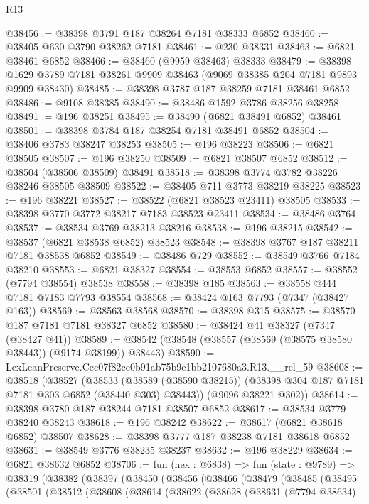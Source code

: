 \begin{lexlean}{R13}
\begin{coremodule}
@38456 := @38398 @3791 @187 @38264 @7181 @38333 @6852
@38460 := @38405 @630 @3790 @38262 @7181
@38461 := @230 @38331
@38463 := @6821 @38461 @6852
@38466 := @38460 (@9959 @38463) @38333
@38479 := @38398 @1629 @3789 @7181 @38261 @9909 @38463 (@9069 @38385 @204 @7181 @9893 @9909 @38430)
@38485 := @38398 @3787 @187 @38259 @7181 @38461 @6852
@38486 := @9108 @38385
@38490 := @38486 @1592 @3786 @38256 @38258
@38491 := @196 @38251
@38495 := @38490 (@6821 @38491 @6852) @38461
@38501 := @38398 @3784 @187 @38254 @7181 @38491 @6852
@38504 := @38406 @3783 @38247 @38253
@38505 := @196 @38223
@38506 := @6821 @38505
@38507 := @196 @38250
@38509 := @6821 @38507 @6852
@38512 := @38504 (@38506 @38509) @38491
@38518 := @38398 @3774 @3782 @38226 @38246 @38505 @38509
@38522 := @38405 @711 @3773 @38219 @38225
@38523 := @196 @38221
@38527 := @38522 (@6821 @38523 @23411) @38505
@38533 := @38398 @3770 @3772 @38217 @7183 @38523 @23411
@38534 := @38486 @3764
@38537 := @38534 @3769 @38213 @38216
@38538 := @196 @38215
@38542 := @38537 (@6821 @38538 @6852) @38523
@38548 := @38398 @3767 @187 @38211 @7181 @38538 @6852
@38549 := @38486 @729
@38552 := @38549 @3766 @7184 @38210
@38553 := @6821 @38327
@38554 := @38553 @6852
@38557 := @38552 (@7794 @38554) @38538
@38558 := @38398 @185
@38563 := @38558 @444 @7181 @7183 @7793 @38554
@38568 := @38424 @163 @7793 (@7347 (@38427 @163))
@38569 := @38563 @38568
@38570 := @38398 @315
@38575 := @38570 @187 @7181 @7181 @38327 @6852
@38580 := @38424 @41 @38327 (@7347 (@38427 @41))
@38589 := @38542 (@38548 (@38557 (@38569 (@38575 @38580 @38443)) (@9174 @38199)) @38443)
@38590 := LexLeanPreserve.Cec07f82ce0b91ab75b9e1bb2107680a3.R13.__rel_59
@38608 := @38518
    (@38527
      (@38533
        (@38589 (@38590 @38215))
        (@38398 @304 @187 @7181 @7181 @303 @6852 (@38440 @303) @38443))
      (@9096 @38221 @302))
@38614 := @38398 @3780 @187 @38244 @7181 @38507 @6852
@38617 := @38534 @3779 @38240 @38243
@38618 := @196 @38242
@38622 := @38617 (@6821 @38618 @6852) @38507
@38628 := @38398 @3777 @187 @38238 @7181 @38618 @6852
@38631 := @38549 @3776 @38235 @38237
@38632 := @196 @38229
@38634 := @6821 @38632 @6852
@38706 := fun (hex : @6838) =>
  fun (state : @9789) =>
  @38319
    (@38382
      (@38397
        (@38450
          (@38456
            (@38466
              (@38479
                (@38485
                  (@38495
                    (@38501
                      (@38512
                        (@38608
                          (@38614
                            (@38622
                              (@38628
                                (@38631
                                  (@7794 @38634)

\end{coremodule}
\end{lexlean}
